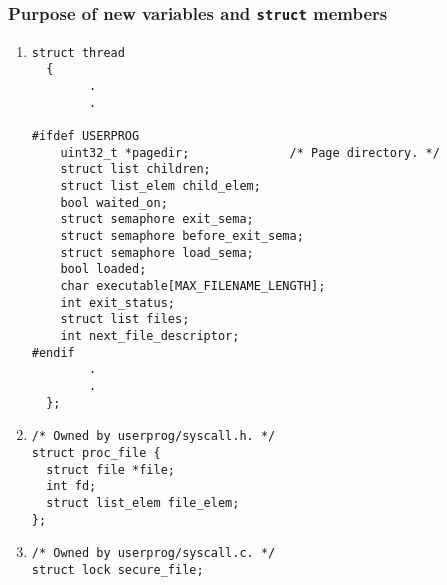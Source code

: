 \documentclass{article}
\renewcommand{\_}{\char`_}
\begin{document}
\subsubsection{Purpose of new variables and \texttt{struct} members}
\begin{enumerate}

\item \begin{lstlisting}
struct thread
  {
		.
		.
		
#ifdef USERPROG
    uint32_t *pagedir;              /* Page directory. */
    struct list children;
    struct list_elem child_elem;  
    bool waited_on;        
    struct semaphore exit_sema;
    struct semaphore before_exit_sema; 
    struct semaphore load_sema;  
    bool loaded;
    char executable[MAX_FILENAME_LENGTH]; 
    int exit_status;
    struct list files;        
    int next_file_descriptor;  
#endif
		.
		.
  };
\end{lstlisting}

\item \begin{lstlisting}
/* Owned by userprog/syscall.h. */
struct proc_file {
  struct file *file;
  int fd;
  struct list_elem file_elem;
};
\end{lstlisting}

\item \begin{lstlisting}
/* Owned by userprog/syscall.c. */
struct lock secure_file;
\end{lstlisting}

\end{enumerate}
\end{document}
